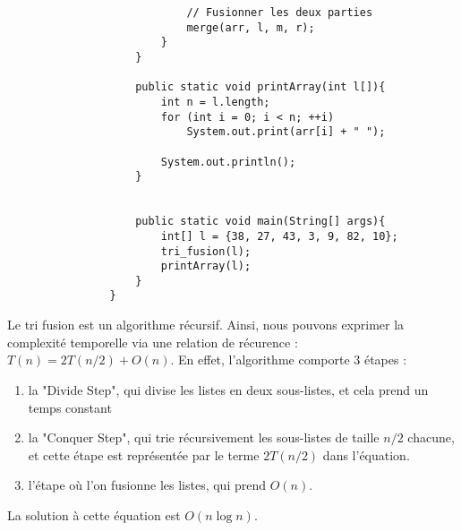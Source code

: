 \begin{Exercice} [20 minutes]
\begin{verbatim}
                            // Fusionner les deux parties
                            merge(arr, l, m, r); 
                        } 
                    }
                    
                    public static void printArray(int l[]){ 
                        int n = l.length; 
                        for (int i = 0; i < n; ++i) 
                            System.out.print(arr[i] + " "); 
                  
                        System.out.println(); 
                    } 
          
                    
                    public static void main(String[] args){
                        int[] l = {38, 27, 43, 3, 9, 82, 10};
                        tri_fusion(l);
                        printArray(l);
                    }
                }
        \end{verbatim}
        
        Le tri fusion est un algorithme récursif. Ainsi, nous pouvons exprimer la complexité temporelle via une relation de récurence : $T(n) = 2T(n/2) + O(n)$. En effet, l'algorithme comporte 3 étapes :
        \begin{enumerate}
            \item la "Divide Step", qui divise les listes en deux sous-listes, et cela prend un temps constant
            \item la "Conquer Step", qui trie récursivement les sous-listes de taille $n/2$ chacune, et cette étape est représentée par le terme $2T(n/2)$ dans l'équation.
            \item l'étape où l'on fusionne les listes, qui prend $O(n)$.
        \end{enumerate}
        La solution à cette équation est $O(n \log n)$.
    
\end{Exercice}


